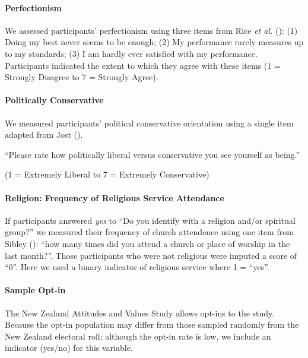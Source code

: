 \documentclass[
  singlecolumn]{article}
\let\oldparagraph\paragraph
\renewcommand{\paragraph}[1]{\oldparagraph{#1}\mbox{}}
\begin{document}
\paragraph{Perfectionism}\label{perfectionism}

We assessed participants' perfectionism using three items from Rice
\emph{et al.} (): (1) Doing my best
never seems to be enough; (2) My performance rarely measures up to my
standards; (3) I am hardly ever satisfied with my performance.
Participants indicated the extent to which they agree with these items
(1 = Strongly Disagree to 7 = Strongly Agree).

\paragraph{Politically Conservative}\label{politically-conservative}

We measured participants' political conservative orientation using a
single item adapted from Jost ().

``Please rate how politically liberal versus conservative you see
yourself as being.''

(1 = Extremely Liberal to 7 = Extremely Conservative)

\paragraph{Religion: Frequency of Religious Service
Attendance}\label{religion-frequency-of-religious-service-attendance}

If participants answered \emph{yes} to ``Do you identify with a religion
and/or spiritual group?'' we measured their frequency of church
attendence using one item from Sibley ():
``how many times did you attend a church or place of worship in the last
month?''. Those participants who were not religious were imputed a score
of ``0''. Here we used a binary indicator of religious service where 1 =
``yes''.

\paragraph{Sample Opt-in}\label{sample-opt-in}

The New Zealand Attitudes and Values Study allows opt-ins to the study.
Because the opt-in population may differ from those sampled randomly
from the New Zealand electoral roll; although the opt-in rate is low, we
include an indicator (yes/no) for this variable.
\end{document}
